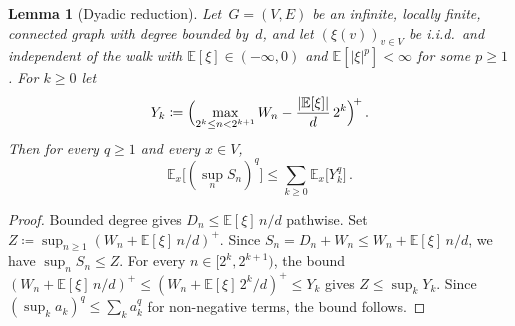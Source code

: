 \documentclass[11pt]{amsart}
\theoremstyle{plain}
\newtheorem{lemma}[theorem]{Lemma}
\theoremstyle{definition}
\newcommand{\E}{\mathbb{E}}
\begin{document}
	\begin{lemma}[Dyadic reduction]\label{lem:dyadic}
		Let~$G = (V,E)$ be an infinite, locally finite, connected graph with degree bounded by~$d$, and let $(\xi(v))_{v\in V}$ be i.i.d.\ and independent of the walk with $\E[\xi]\in(-\infty,0)$ and $\E[|\xi|^p]<\infty$ for some $p\geq 1$. For $k\geq 0$ let
		\[
		Y_k\coloneqq\Bigl(\max_{2^k\leq n<2^{k+1}}W_n-\frac{|\E[\xi]|}{d}\,2^k\Bigr)^{\!+}\,.
		\]
		Then for every $q\geq 1$ and every $x\in V$,
		\begin{equation}\label{eq:dyadic-bound}
			\E_x\bigl[(\sup_n S_n)^q\bigr]\leq\sum_{k\geq 0}\E_x\bigl[Y_k^q\bigr]\,.
		\end{equation}
	\end{lemma}
	\begin{proof}
		Bounded degree gives $D_n\leq \E[\xi]\,n/d$ pathwise. Set $Z\coloneqq\sup_{n\geq 1}(W_n+\E[\xi]\,n/d)^+$. Since $S_n=D_n+W_n\leq W_n+\E[\xi]\,n/d$, we have $\sup_n S_n\leq Z$. For every $n\in[2^k,2^{k+1})$, the bound $(W_n+\E[\xi]\,n/d)^+\leq(W_n+\E[\xi]\,2^k/d)^+\leq Y_k$ gives $Z\leq\sup_k Y_k$. Since $(\sup_k a_k)^q\leq\sum_k a_k^q$ for non-negative terms, the bound follows.
	\end{proof}
	
\end{document}
